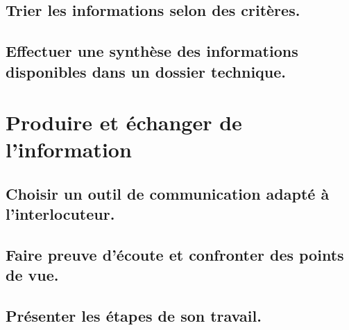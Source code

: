 \documentclass[10pt,fleqn]{book}
\begin{document}
\begin{multicols}{2} 

\end{multicols}

\subsection{Trier les informations selon des critères.} 

\begin{multicols}{2} 

\end{multicols}

\subsection{Effectuer une synthèse des informations disponibles dans un dossier technique.} 

\begin{multicols}{2} 

\end{multicols}

\section{Produire et échanger de l'information} 

\subsection{Choisir un outil de communication adapté à l’interlocuteur.} 

\begin{multicols}{2} 

\end{multicols}

\subsection{Faire preuve d’écoute et confronter des points de vue.} 

\begin{multicols}{2} 

\end{multicols}

\subsection{Présenter les étapes de son travail.} 

\begin{multicols}{2} 

\end{multicols}
\end{document}
